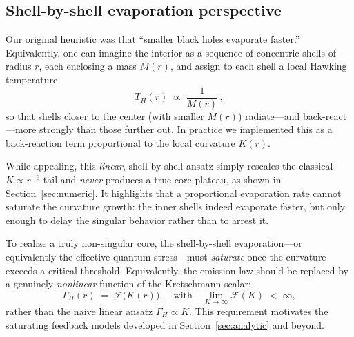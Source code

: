\subsection{Shell-by-shell evaporation perspective}
\label{sec:shell_evap}

Our original heuristic was that “smaller black holes evaporate faster.”  Equivalently, one can imagine the interior as a sequence of concentric shells of radius \(r\), each enclosing a mass \(M(r)\), and assign to each shell a local Hawking temperature
\[
  T_H(r)\;\propto\;\frac{1}{M(r)}\,,
\]
so that shells closer to the center (with smaller \(M(r)\)) radiate—and back-react—more strongly than those further out.  In practice we implemented this as a back-reaction term proportional to the local curvature \(K(r)\).  

While appealing, this \emph{linear}, shell-by-shell ansatz simply rescales the classical \(K\propto r^{-6}\) tail and \emph{never} produces a true core plateau, as shown in Section~\ref{sec:numeric}.  It highlights that a proportional evaporation rate cannot saturate the curvature growth: the inner shells indeed evaporate faster, but only enough to delay the singular behavior rather than to arrest it.  

To realize a truly non-singular core, the shell-by-shell evaporation—or equivalently the effective quantum stress—must \emph{saturate} once the curvature exceeds a critical threshold.  Equivalently, the emission law should be replaced by a genuinely \emph{nonlinear} function of the Kretschmann scalar:
\[
  \Gamma_H(r)\;=\;\mathcal{F}\bigl(K(r)\bigr),
  \quad
  \text{with}
  \quad
  \lim_{K\to\infty}\mathcal{F}(K)\;<\;\infty,
\]
rather than the naive linear ansatz
\(\Gamma_H\propto K\).  This requirement motivates the saturating feedback models developed in Section~\ref{sec:analytic} and beyond.  
